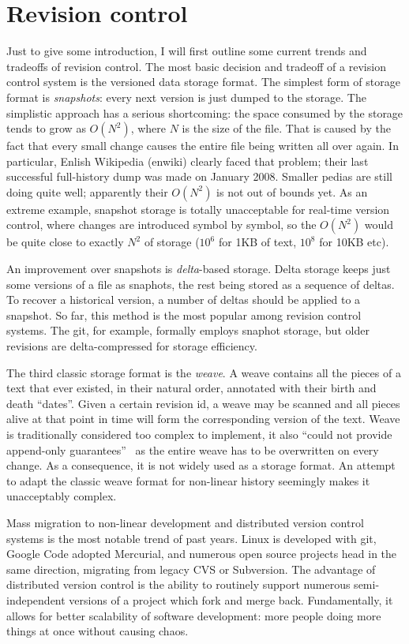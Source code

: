 \documentclass{acm_proc_article-sp}
\begin{document}
\section{Revision control} \label{sec:scm}

Just to give some introduction, I will first outline some current
trends and tradeoffs of revision control. The most
basic decision and tradeoff of a revision control system
is the versioned data
storage format. The simplest form of storage format is \emph{snapshots}:
every next version is just dumped to the storage. The simplistic
approach has a serious shortcoming: the space consumed by the storage
tends to grow as $O(N^2)$, where $N$ is the size of the file.
That is caused by the fact that every small change causes the
entire file being written all over again. In particular, Enlish
Wikipedia (enwiki) clearly faced that problem; their last successful
full-history dump was made on January 2008. Smaller pedias are
still doing quite well; apparently their $O(N^2)$ is not
out of bounds yet.
As an extreme example, snapshot storage is totally
unacceptable for real-time version control, where changes
are introduced symbol by symbol, so the $O(N^2)$ would be quite
close to exactly $N^2$ of storage ($10^{6}$ for 1KB of text,
$10^{8}$ for 10KB etc).

An improvement over snapshots is \emph{delta}-based storage. 
Delta storage keeps just some versions of a file as snaphots,
the rest being stored as a sequence of deltas. To recover a
historical version, a number of deltas should be applied
to a snapshot. 
So far, this method is the most popular among revision control
systems. The git, for example, formally employs snaphot storage,
but older revisions are delta-compressed for storage efficiency. 

The third classic storage format is the \emph{weave}. 
A weave contains all the pieces of a text that ever existed,
in their natural order, annotated with their birth and
death ``dates''. Given a certain revision id, a weave may be
scanned and all pieces alive at that point in time will form the
corresponding version of the text. Weave is traditionally
considered too complex to implement, it also
``could not provide append-only guarantees''~\cite{bazaar-weave}
as the entire
weave has to be overwritten on every change. As a consequence, 
it is not widely used as a storage format.
An attempt to adapt the classic weave format for non-linear
history seemingly makes it unacceptably complex.

Mass migration to non-linear development and distributed
version control systems is the most notable trend of past
years. Linux is developed with git, Google Code adopted
Mercurial, and numerous open source projects head in the
same direction, migrating from legacy CVS or Subversion.
The advantage of distributed version control is the ability
to routinely support numerous semi-independent versions
of a project which fork and merge back.
Fundamentally, it allows for better scalability of
software development: more people doing more things at
once without causing chaos.
\end{document}
